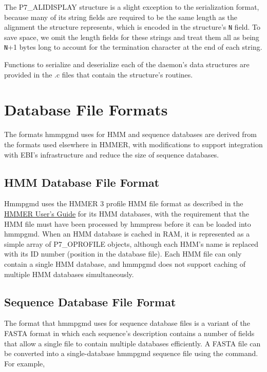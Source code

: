 \documentclass[notoc,justified]{tufte-book}    %
\begin{document}
The {P7\_ALIDISPLAY} structure is a slight exception to the serialization format, because many of its string fields are required to be the same length as the alignment the structure represents, which is encoded in the structure's {\tt N} field.  To save space, we omit the length fields for these strings and treat them all as being {\tt N}+1 bytes long to account for the termination character at the end of each string.

Functions to serialize and deserialize each of the daemon's data structures are provided in the .c files that contain the structure's routines.     

\chapter{Database File Formats}
The formats hmmpgmd uses for HMM and sequence databases are derived from the formats used elsewhere in HMMER, with modifications to support integration with EBI's infrastructure and reduce the size of sequence databases.

\section{HMM Database File Format}
Hmmpgmd uses the HMMER 3 profile HMM file format as described in the \underline{HMMER User's Guide} for its HMM databases, with the requirement that the HMM file must have been processed by hmmpress before it can be loaded into hmmpgmd.  When an HMM database is cached in RAM, it is represented as a simple array of P7\_OPROFILE objects, although each HMM's name is replaced with its ID number (position in the database file).  Each HMM file can only contain a single HMM database, and hmmpgmd does not support caching of multiple HMM databases simultaneously.

\section{Sequence Database File Format}
The  format that hmmpgmd uses for sequence database files is a variant of the FASTA format in which each sequence's description contains a number of fields that allow a single file to contain multiple databases efficiently.  A FASTA file can be converted into a single-database hmmpgmd sequence file using the  command.  For example, 

\end{document}

